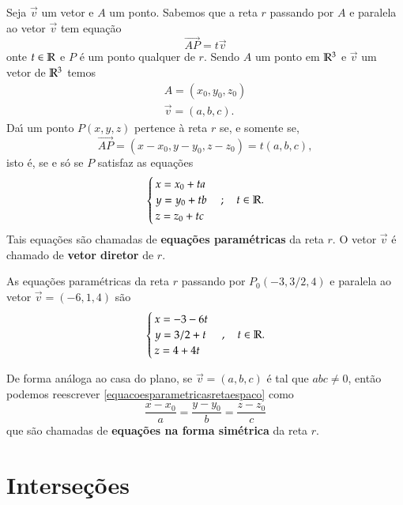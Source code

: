 Seja $\vec{v}$ um vetor e $A$ um ponto. Sabemos que a reta $r$ passando por $A$ e paralela ao vetor $\vec{v}$ tem equa\c{c}\~ao
\begin{equation}
    \vec{AP} = t\vec{v}
\end{equation}
onte $t \in \mathbb{R}$ e $P$ \'e um ponto qualquer de $r$. Sendo $A$ um ponto em $\mathbb{R}^3$ e $\vec{v}$ um vetor de $\mathbb{R}^3$ temos
\begin{align*}
    A = (x_0, y_0, z_0)\\
    \vec{v} = (a, b, c).
\end{align*}
Da{\'\i} um ponto $P(x, y, z)$ pertence \`a reta $r$ se, e somente se,
\[
    \vec{AP} = (x - x_0, y - y_0, z - z_0) = t(a, b, c),
\]
isto \'e, se e s\'o se $P$ satisfaz as equa\c{c}\~oes
\begin{equation}\label{equacoesparametricasretaespaco}
    \begin{cases}
        x = x_0 + ta\\
        y = y_0 + tb\\
        z = z_0 + tc
    \end{cases}; \quad t \in \mathbb{R}.
\end{equation}
Tais equa\c{c}\~oes s\~ao chamadas de \textbf{equa\c{c}\~oes param\'etricas} da reta $r$. O vetor $\vec{v}$ \'e chamado de \textbf{vetor diretor} de $r$.

\begin{exemplo}
    As equa\c{c}\~oes param\'etricas da reta $r$ passando por $P_0(-3,3/2,4)$ e paralela ao vetor $\vec{v} = (-6,1,4)$ s\~ao
    \[
        \begin{cases}
            x = -3 - 6t\\
            y = 3/2 + t\\
            z = 4 + 4t
        \end{cases},\quad t \in \mathbb{R}.
    \]
\end{exemplo}

De forma an\'aloga ao casa do plano, se $\vec{v} = (a,b,c)$ \'e tal que $abc \ne 0$, ent\~ao podemos reescrever \eqref{equacoesparametricasretaespaco} como
\[
    \dfrac{x - x_0}{a} = \dfrac{y - y_0}{b} = \dfrac{z - z_0}{c}
\]
que s\~ao chamadas de \textbf{equa\c{c}\~oes na forma sim\'etrica} da reta $r$.
\section{Interse\c{c}\~oes} %
\label{sec:intersecoes}
